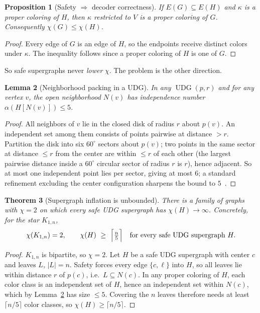 \documentclass[11pt]{article}
\newtheorem{theorem}{Theorem}[section]
\newtheorem{proposition}[theorem]{Proposition}
\newtheorem{lemma}[theorem]{Lemma}
\theoremstyle{definition}
\theoremstyle{remark}
\newcommand{\UDG}{\operatorname{UDG}}
\newcommand{\indep}{\alpha}
\begin{document}
\begin{proposition}[Safety $\Rightarrow$ decoder correctness]
\label{prop:safety}
If $E(G)\subseteq E(H)$ and $\kappa$ is a proper coloring of $H$, then $\kappa$
restricted to $V$ is a proper coloring of $G$. Consequently
$\chi(G)\le\chi(H)$.
\end{proposition}

\begin{proof}
Every edge of $G$ is an edge of $H$, so the endpoints receive distinct colors
under $\kappa$. The inequality follows since a proper coloring of $H$ is one of
$G$.
\end{proof}

So safe supergraphs never \emph{lower} $\chi$. The problem is the other direction.

\begin{lemma}[Neighborhood packing in a UDG]
\label{lem:packing}
In any $\UDG(p,r)$ and for any vertex $v$, the open neighborhood $N(v)$ has
independence number $\indep(H[N(v)])\le 5$.
\end{lemma}

\begin{proof}
All neighbors of $v$ lie in the closed disk of radius $r$ about $p(v)$. An
independent set among them consists of points pairwise at distance $>r$. Partition
the disk into six $60^\circ$ sectors about $p(v)$; two points in the same sector at
distance $\le r$ from the center are within $\le r$ of each other (the largest
pairwise distance inside a $60^\circ$ circular sector of radius $r$ is $r$), hence
adjacent. So at most one independent point lies per sector, giving at most
$6$; a standard refinement excluding the center configuration sharpens the bound
to $5$~\cite{Heppes2003}.
\end{proof}

\begin{theorem}[Supergraph inflation is unbounded]
\label{thm:impossibility}
There is a family of graphs with $\chi=2$ on which every safe UDG supergraph has
$\chi(H)\to\infty$. Concretely, for the star $K_{1,n}$,
\[
  \chi(K_{1,n}) = 2, \qquad \chi(H)\ \ge\ \Bigl\lceil \tfrac{n}{5}\Bigr\rceil
  \quad\text{for every safe UDG supergraph } H.
\]
\end{theorem}

\begin{proof}
$K_{1,n}$ is bipartite, so $\chi=2$. Let $H$ be a safe UDG supergraph with center
$c$ and leaves $L$, $|L|=n$. Safety forces every edge $\{c,\ell\}$ into $H$, so all
leaves lie within distance $r$ of $p(c)$, i.e.\ $L\subseteq N(c)$. In any proper
coloring of $H$, each color class is an independent set of $H$, hence an
independent set within $N(c)$, which by Lemma~\ref{lem:packing} has size $\le 5$.
Covering the $n$ leaves therefore needs at least $\lceil n/5\rceil$ color classes,
so $\chi(H)\ge\lceil n/5\rceil$.
\end{proof}
\end{document}
